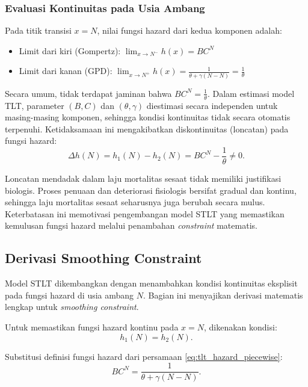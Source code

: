 \subsubsection{Evaluasi Kontinuitas pada Usia Ambang}

Pada titik transisi $x = N$, nilai fungsi hazard dari kedua komponen adalah:
\begin{itemize}
    \item Limit dari kiri (Gompertz): $\lim_{x \to N^-} h(x) = BC^N$
    \item Limit dari kanan (GPD): $\lim_{x \to N^+} h(x) = \frac{1}{\theta + \gamma(N-N)} = \frac{1}{\theta}$
\end{itemize}

Secara umum, tidak terdapat jaminan bahwa $BC^N = \frac{1}{\theta}$. Dalam estimasi model TLT, parameter $(B, C)$ dan $(\theta, \gamma)$ diestimasi secara independen untuk masing-masing komponen, sehingga kondisi kontinuitas tidak secara otomatis terpenuhi. Ketidaksamaan ini mengakibatkan diskontinuitas (loncatan) pada fungsi hazard:
\begin{equation}
\Delta h(N) = h_1(N) - h_2(N) = BC^N - \frac{1}{\theta} \neq 0.
\label{eq:hazard_jump}
\end{equation}



Loncatan mendadak dalam laju mortalitas sesaat tidak memiliki justifikasi biologis. Proses penuaan dan deteriorasi fisiologis bersifat gradual dan kontinu, sehingga laju mortalitas sesaat seharusnya juga berubah secara mulus. Keterbatasan ini memotivasi pengembangan model STLT yang memastikan kemulusan fungsi hazard melalui penambahan \textit{constraint} matematis.

\subsection{Derivasi Smoothing Constraint}

Model STLT dikembangkan dengan menambahkan kondisi kontinuitas eksplisit pada fungsi hazard di usia ambang $N$. Bagian ini menyajikan derivasi matematis lengkap untuk \textit{smoothing constraint}.

Untuk memastikan fungsi hazard kontinu pada $x = N$, dikenakan kondisi:
\begin{equation}
h_1(N) = h_2(N).
\label{eq:smoothing_condition}
\end{equation}

Substitusi definisi fungsi hazard dari persamaan \eqref{eq:tlt_hazard_piecewise}:
\begin{equation}
BC^N = \frac{1}{\theta + \gamma(N-N)}.
\label{eq:smoothing_substitution}
\end{equation}


